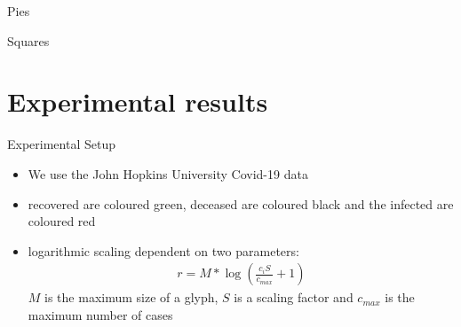 \documentclass{beamer}
\begin{document}
\begin{frame}{Pies}
\end{frame}

\begin{frame}{Squares}
\end{frame}

\section{Experimental results}

\begin{frame}{Experimental Setup}
  \begin{itemize}
    \item We use the John Hopkins University Covid-19 data
    \item recovered are coloured green, deceased are coloured black and		the infected are coloured red
    \item logarithmic scaling dependent on two parameters:
      \begin{align*}
	r=M* \log \left( \frac{c_i S}{c_{max}} +1 \right)
      \end{align*}
      $M$ is the maximum size of a glyph, $S$ is a scaling factor and $c_{max}$ is			the maximum number of cases
  \end{itemize}
\end{frame}
\end{document}
